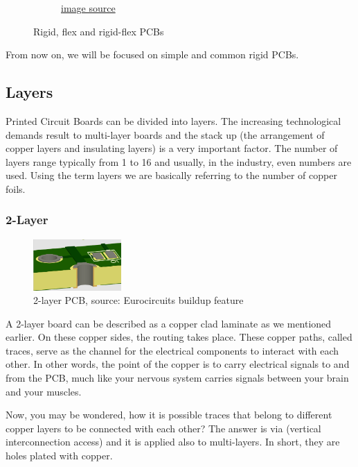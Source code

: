 \documentclass[final]{cubedoc}
\begin{document}
\begin{figure}[h!]
\begin{subfigure}{.3\textwidth}
			\caption{\href{https://web.archive.org/web/20200813145720/https://www.allaboutcircuits.com/technical-articles/pcbs-rigid-vs.-flexible-which-one-is-best-for-your-next-project/}{image source}}
			\label{fig:sub2}
		\end{subfigure}
		\caption{Rigid, flex and rigid-flex PCBs}
		\label{fig:test}
	\end{figure}
	
	From now on, we will be focused on simple and common rigid PCBs.
	
	\subsection{Layers}
	
	Printed Circuit Boards can be divided into layers. The increasing technological demands result to multi-layer boards and the stack up (the arrangement of copper layers and insulating layers)  is a very important factor. The number of layers range typically from 1 to 16 
	and usually, in the industry, even numbers are used. Using the term layers we are basically referring to the number of copper foils.
	
	\subsubsection{2-Layer}
	
	\begin{figure}
		\centering
		\includegraphics[height=.1\textheight, width=0.3\textwidth]{assets/2_layer_euro_3D.png}
		\caption{2-layer PCB, \small{source: Eurocircuits buildup feature}}
	\end{figure}
	
	A 2-layer board can be described as a copper clad laminate as we mentioned earlier. On these copper sides, the routing takes place. These copper paths, called traces, serve as the channel for the electrical components to interact with each other. In other words, the point of the copper is to carry electrical signals to and from the PCB, much like your nervous system carries signals between your brain and your muscles. 
	
	Now, you may be wondered, how it is possible traces that belong to different copper layers to be connected with each other? The answer is via (vertical interconnection access) and it is applied also to multi-layers. In short, they are holes plated with copper.
	
\end{document}
